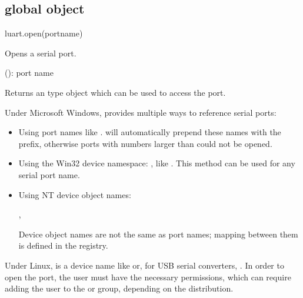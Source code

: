 \documentclass[a4paper,12pt,twoside,extrafontsizes]{memoir}
\begin{document}
\subsection{ global object}


\begin{luafuncprototype}
luart.open(portname)
\end{luafuncprototype}

\begin{funcdescr}
	Opens a serial port.
\end{funcdescr}

\begin{funcparams}
	 (): port name
\end{funcparams}

\begin{funcret}
	Returns an  type object which can be used to access the port.
\end{funcret}

\begin{funcremarks}
	Under Microsoft Windows,  provides multiple ways to reference serial ports:
	
	\begin{itemize}
	\item Using port names like .  will automatically prepend these names with the  prefix, otherwise ports with numbers larger than  could not be opened.
	\item Using the Win32 device namespace: , like . This method can be used for any serial port name.
	\item Using NT device object names:
	
	,
	
	Device object names are not the same as port names; mapping between them is defined in the registry.
	\end{itemize}
	
	Under Linux,  is a device name like  or, for USB serial converters, . In order to open the port, the user must have the necessary permissions, which can require adding the user to the  or  group, depending on the distribution.
\end{funcremarks}
\end{document}
